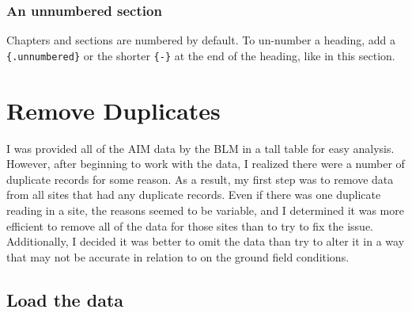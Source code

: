 \documentclass[
]{book}
\newenvironment{Shaded}{\begin{snugshade}}{\end{snugshade}}
\newcommand{\DataTypeTok}[1]{\textcolor[rgb]{0.13,0.29,0.53}{#1}}
\newcommand{\KeywordTok}[1]{\textcolor[rgb]{0.13,0.29,0.53}{\textbf{#1}}}
\newcommand{\NormalTok}[1]{#1}
\newcommand{\OperatorTok}[1]{\textcolor[rgb]{0.81,0.36,0.00}{\textbf{#1}}}
\newcommand{\StringTok}[1]{\textcolor[rgb]{0.31,0.60,0.02}{#1}}
\begin{document}
\hypertarget{an-unnumbered-section}{%
\subsection*{An unnumbered section}\label{an-unnumbered-section}}

Chapters and sections are numbered by default. To un-number a heading, add a \texttt{\{.unnumbered\}} or the shorter \texttt{\{-\}} at the end of the heading, like in this section.

\hypertarget{remove-duplicates}{%
\chapter{Remove Duplicates}\label{remove-duplicates}}

I was provided all of the AIM data by the BLM in a tall table for easy analysis. However, after beginning to work with the data, I realized there were a number of duplicate records for some reason. As a result, my first step was to remove data from all sites that had any duplicate records. Even if there was one duplicate reading in a site, the reasons seemed to be variable, and I determined it was more efficient to remove all of the data for those sites than to try to fix the issue. Additionally, I decided it was better to omit the data than try to alter it in a way that may not be accurate in relation to on the ground field conditions.

\hypertarget{load-the-data}{%
\section{Load the data}\label{load-the-data}}

\begin{Shaded}
\end{Shaded}
\end{document}
